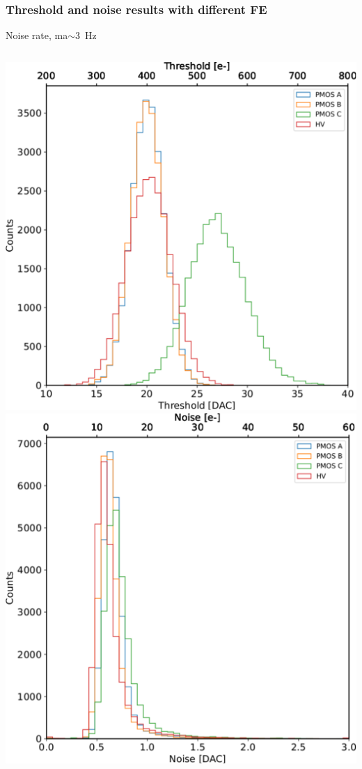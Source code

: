     \begin{frame}
        \frametitle{Threshold and noise results with different FE}
        Noise rate, ma$\sim$\SI{3}{Hz}

        \begin{columns}
                \includegraphics[width=.95\linewidth]{figures/charaterization/threshold_histogram.pdf}
                \includegraphics[width=.95\linewidth]{figures/charaterization/noise_histogram.pdf} 

\end{columns}
\end{frame}
